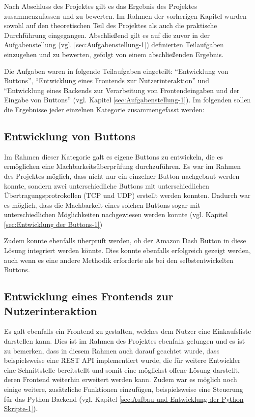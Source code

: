 Nach Abschluss des Projektes gilt es das Ergebnis des Projektes zusammenzufassen und zu bewerten. Im Rahmen der vorherigen Kapitel wurden sowohl auf den theoretischen Teil des Projektes als auch die praktische Durchführung eingegangen. Abschließend gilt es auf die zuvor in der Aufgabenstellung (vgl. \ref{sec:Aufgabenstellung-1}) definierten Teilaufgaben einzugehen und zu bewerten, gefolgt von einem abschließenden Ergebnis. 

Die Aufgaben waren in folgende Teilaufgaben eingeteilt: ``Entwicklung von Buttons'', ``Entwicklung eines Frontends zur Nutzerinteraktion'' und ``Entwicklung eines Backends zur Verarbeitung von Frontendeingaben und der Eingabe von Buttons'' (vgl. Kapitel \ref{sec:Aufgabenstellung-1}). Im folgenden sollen die Ergebnisse jeder einzelnen Kategorie zusammengefasst werden:

\subsection{Entwicklung von Buttons}
\label{sec:ErgebnisButtons}
Im Rahmen dieser Kategorie galt es eigene Buttons zu entwickeln, die es ermöglichen eine Machbarkeitsüberprüfung durchzuführen. Es war im Rahmen des Projektes möglich, dass nicht nur ein einzelner Button nachgebaut werden konnte, sondern zwei unterschiedliche Buttons mit unterschiedlichen Übertragungsprotrokollen (TCP und UDP) erstellt werden konnten. Dadurch war es möglich, dass die Machbarkeit eines solchen Buttons sogar mit unterschiedlichen Möglichkeiten nachgewiesen werden konnte (vgl. Kapitel \ref{sec:Entwicklung der Buttons-1})

Zudem konnte ebenfalls überprüft werden, ob der Amazon Dash Button in diese Lösung integriert werden könnte. Dies konnte ebenfalls erfolgreich gezeigt werden, auch wenn es eine andere Methodik erforderte als bei den selbstentwickelten Buttons.

\subsection{Entwicklung eines Frontends zur Nutzerinteraktion}
\label{sec:ErgebnisFrontend}
Es galt ebenfalls ein Frontend zu gestalten, welches dem Nutzer eine Einkaufsliste darstellen kann. Dies ist im Rahmen des Projektes ebenfalls gelungen und es ist zu bemerken, dass in diesem Rahmen auch darauf geachtet wurde, dass beispielsweise eine \ac{REST} \ac{API} implementiert wurde, die für weitere Entwickler eine Schnittstelle bereitstellt und somit eine möglichst offene Lösung darstellt, deren Frontend weiterhin erweitert werden kann. Zudem war es möglich noch einige weitere, zusätzliche Funktionen einzufügen, beispielsweise eine Steuerung für das Python Backend (vgl. Kapitel \ref{sec:Aufbau und Entwicklung der Python Skripte-1}). 

